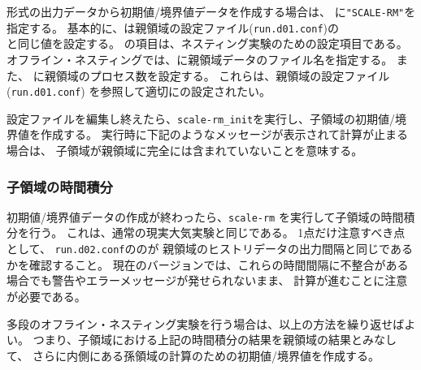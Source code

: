 \scalerm 形式の出力データから初期値/境界値データを作成する場合は、
に\verb|"SCALE-RM"|を指定する。
基本的に、は親領域の設定ファイル(\verb|run.d01.conf|)の\\
と同じ値を設定する。
%
の項目は、ネスティング実験のための設定項目である。
オフライン・ネスティングでは、に親領域データのファイル名を指定する。
また、 に親領域のプロセス数を設定する。
これらは、親領域の設定ファイル(\verb|run.d01.conf|) を参照して適切にの設定されたい。


設定ファイルを編集し終えたら、\verb|scale-rm_init|を実行し、子領域の初期値/境界値を作成する。
実行時に下記のようなメッセージが表示されて計算が止まる場合は、
子領域が親領域に完全には含まれていないことを意味する。


\subsubsection{子領域の時間積分}
初期値/境界値データの作成が終わったら、\verb|scale-rm| を実行して子領域の時間積分を行う。
これは、通常の現実大気実験と同じである。
1点だけ注意すべき点として、
\verb|run.d02.conf|ののが
親領域のヒストリデータの出力間隔と同じであるかを確認すること。
現在のバージョンでは、これらの時間間隔に不整合がある場合でも警告やエラーメッセージが発せられないまま、
計算が進むことに注意が必要である。

多段のオフライン・ネスティング実験を行う場合は、以上の方法を繰り返せばよい。
つまり、子領域における上記の時間積分の結果を親領域の結果とみなして、
さらに内側にある孫領域の計算のための初期値/境界値を作成する。
